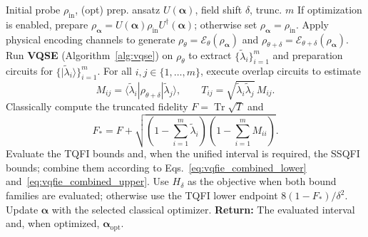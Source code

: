 \begin{algorithm}[H]
    \caption{Variational Quantum Fisher Information Estimation (VQFIE)}
    \label{alg:vqfie}
    \begin{algorithmic}[1]
        \Require Initial probe $\rho_{\text{in}}$, (opt) prep. ansatz $U(\boldsymbol{\alpha})$, field shift $\delta$, trunc.  $m$
        \State If optimization is enabled, prepare $\rho_{\boldsymbol{\alpha}}=U(\boldsymbol{\alpha})\rho_{\text{in}}U^\dagger(\boldsymbol{\alpha})$; otherwise set $\rho_{\boldsymbol{\alpha}}=\rho_{\text{in}}$.
        \State Apply physical encoding channels to generate $\rho_\theta = \mathcal{E}_\theta(\rho_{\boldsymbol{\alpha}})$ and $\rho_{\theta+\delta} = \mathcal{E}_{\theta+\delta}(\rho_{\boldsymbol{\alpha}})$.
        \State Run \textbf{VQSE} (Algorithm~\ref{alg:vqse}) on $\rho_\theta$ to extract $\{\tilde{\lambda}_i\}_{i=1}^m$ and preparation circuits for $\{|\tilde{\lambda}_i\rangle\}_{i=1}^m$.
        \State For all $i,j \in \{1,\dots,m\}$, execute overlap circuits to estimate
        \[
            M_{ij}=\langle\tilde{\lambda}_i|\rho_{\theta+\delta}|\tilde{\lambda}_j\rangle,
            \qquad
            T_{ij}=\sqrt{\tilde{\lambda}_i\tilde{\lambda}_j}\,M_{ij}.
        \]
        \State Classically compute the truncated fidelity $F=\operatorname{Tr}\sqrt{T}$ and
        \[
            F_*=F+\sqrt{\left(1-\sum_{i=1}^m\tilde{\lambda}_i\right)
                \left(1-\sum_{i=1}^m M_{ii}\right)}.
        \]
        \State Evaluate the TQFI bounds and, when the unified interval is required, the SSQFI bounds; combine them according to Eqs.~\eqref{eq:vqfie_combined_lower} and~\eqref{eq:vqfie_combined_upper}.
        \State Use $H_\delta$ as the objective when both bound families are evaluated; otherwise use the TQFI lower endpoint $8(1-F_*)/\delta^2$.
        \State Update $\boldsymbol{\alpha}$ with the selected classical optimizer.
        \EndIf
        \EndFor
        \State \textbf{Return:} The evaluated interval and, when optimized, $\boldsymbol{\alpha}_{\text{opt}}$.
    \end{algorithmic}
\end{algorithm}

